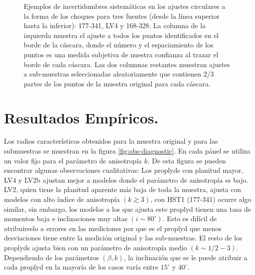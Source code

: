 \begin{figure}
\begin{tabular}{@{}c@{}c@{}c@{}}
\end{tabular}
\caption{Ejemplos de incertidumbres sistemáticas en los ajustes circulares a la forma de los choques para tres fuentes (desde la línea superior hasta la inferior): 177-341, LV4 y 168-328. La columna de la izquierda muestra el ajuste a todos los puntos identificados en el borde de la cáscara, donde el número y el espaciamiento de los puntos es una medida subjetiva de nuestra confianza al trazar el borde de cada cáscara. Las dos columnas restantes muestran ajustes a sub-muestras seleccionadas aleatoriamente que contienen 2/3 partes de los puntos de la muestra original para cada cáscara.}
\label{fig:char-radii-obs}
\end{figure}

\section{Resultados Empíricos.}

Los radios característicos obtenidos para la muestra original y para las submuestras se muestran en la figura \ref{fig:obs-diagnostic}. En cada pánel se utiliza un valor fijo para el parámetro de anisotropía $k$. De esta figura se pueden encontrar algunas observaciones cualitativas: Los proplyds con planitud mayor, LV4 y LV2b ajustan mejor a modelos donde el parámetro de anisotropía es bajo. LV2, quien tiene la planitud aparente más baja de toda la muestra, ajusta con modelos con alto índice de anisotropía $(k \gtrsim 3)$, con HST1 (177-341) ocurre algo similar, sin embargo, los modelos a los que ajusta este proplyd tienen una tasa de momentos baja e inclinaciones muy altas $(i \sim 80^{\circ})$. Esto es difícil de atribuirselo a errores en las mediciones por que es el proplyd que menos desviaciones tiene entre la medición original y las sub-muestras.  El resto de los proplyds ajusta bien con un parámetro de anisotropía medio $(k\sim 1/2 - 3)$. Dependiendo de los parámetros $(\beta, k)$, la inclinación que se le puede atribuir a cada proplyd en la mayoría de los casos varía entre $15^\circ$ y $40^\circ$. 

